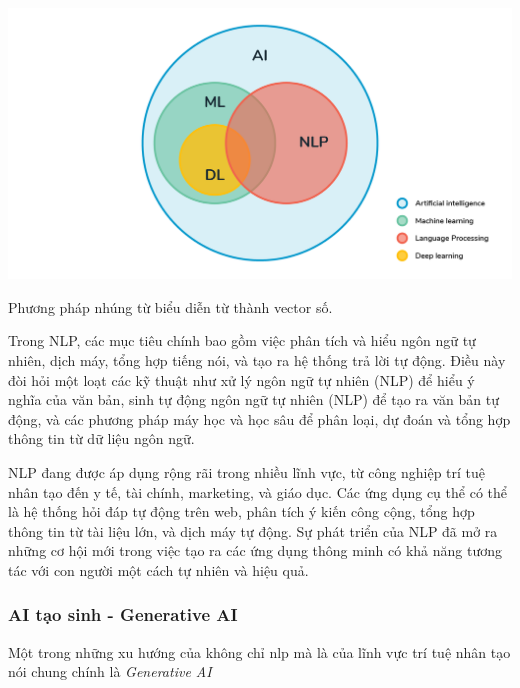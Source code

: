 \documentclass[a4paper, 12pt, openany]{book}
\begin{document}
\vspace{0.5cm}
\begin{minipage}{\linewidth}
    \captionsetup{type=figure}
    \centering
    \includegraphics[width=\linewidth]{./assets/images/nln.png}
    \caption{Phương pháp nhúng từ biểu diễn từ thành vector số.}
\end{minipage}
\vspace{0.5cm}


Trong NLP, các mục tiêu chính bao gồm việc phân tích và hiểu ngôn ngữ tự nhiên, dịch máy, tổng hợp tiếng nói, và tạo ra hệ thống trả lời tự động. Điều này đòi hỏi một loạt các kỹ thuật như xử lý ngôn ngữ tự nhiên (NLP) để hiểu ý nghĩa của văn bản, sinh tự động ngôn ngữ tự nhiên (NLP) để tạo ra văn bản tự động, và các phương pháp máy học và học sâu để phân loại, dự đoán và tổng hợp thông tin từ dữ liệu ngôn ngữ.

NLP đang được áp dụng rộng rãi trong nhiều lĩnh vực, từ công nghiệp trí tuệ nhân tạo đến y tế, tài chính, marketing, và giáo dục. Các ứng dụng cụ thể có thể là hệ thống hỏi đáp tự động trên web, phân tích ý kiến công cộng, tổng hợp thông tin từ tài liệu lớn, và dịch máy tự động. Sự phát triển của NLP đã mở ra những cơ hội mới trong việc tạo ra các ứng dụng thông minh có khả năng tương tác với con người một cách tự nhiên và hiệu quả.

\subsubsection{AI tạo sinh - Generative AI}

Một trong những xu hướng của không chỉ \acl{nlp} mà là của lĩnh vực trí tuệ nhân tạo nói chung chính là \textit{Generative AI}
\end{document}
